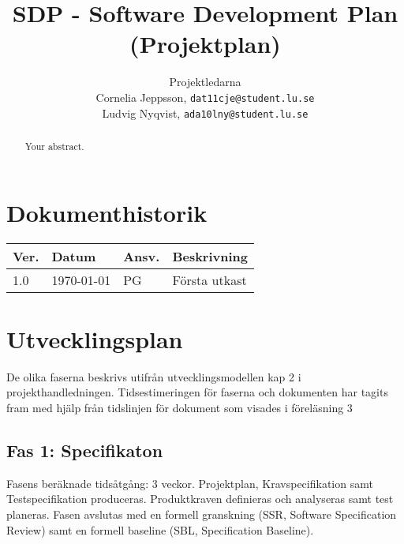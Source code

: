 ﻿\documentclass[a4paper]{article}
\title{SDP - Software Development Plan (Projektplan)}
\author{Projektledarna\\Cornelia Jeppsson, \texttt{dat11cje@student.lu.se}\\
Ludvig Nyqvist, \texttt{ada10lny@student.lu.se}}
\begin{document}
\maketitle
\thispagestyle{fancy}

\begin{abstract}
Your abstract.
\end{abstract}



\tableofcontents
\newpage

\section*{Dokumenthistorik}
\begin{tabular}{ l l l l }
Ver. & Datum & Ansv. & Beskrivning \\\hline
1.0 & \today & PG & Första utkast
\end{tabular}


\section{Utvecklingsplan}

De olika faserna beskrivs utifrån utvecklingsmodellen kap 2 i projekthandledningen\cite{projekthandledning}. Tidsestimeringen för faserna och dokumenten har tagits fram med hjälp från tidslinjen för dokument som visades i föreläsning 3\cite{dokumenttidslinje}
\begin{comment}

En utvecklingsplan som anger fasernas tidsbehov och händelser av betydelse (granskningar och baselines). I utvecklingsplanen beskrivs också eventuell anpassning av utvecklingsmodellen samt dokument till projektet (eng. tailoring)

Det ska finnas referenser till utvecklingsmodellen kap 2 i boken och beskrivning av eventuella anpassningar.
\end{comment}

\subsection{Fas 1: Specifikaton}
Fasens beräknade tidsåtgång: 3 veckor.\newline
Projektplan, Kravspecifikation samt Testspecifikation produceras. Produktkraven definieras och analyseras samt test planeras. Fasen avslutas med en formell granskning (SSR, Software Specification Review) samt en formell baseline (SBL, Specification Baseline).
\end{document}
